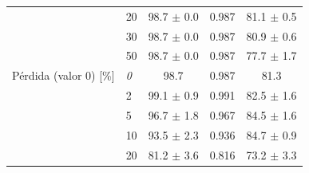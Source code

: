 \begin{table}[t]
\begin{tabular}{llccc}
 & 20 & 98.7 $\pm$ 0.0 & 0.987 & 81.1 $\pm$ 0.5 \\
 & 30 & 98.7 $\pm$ 0.0 & 0.987 & 80.9 $\pm$ 0.6 \\
 & 50 & 98.7 $\pm$ 0.0 & 0.987 & 77.7 $\pm$ 1.7 \\
\midrule
Pérdida (valor 0) [\%] & \textit{0} & 98.7 & 0.987 & 81.3 \\
 & 2 & 99.1 $\pm$ 0.9 & 0.991 & 82.5 $\pm$ 1.6 \\
 & 5 & 96.7 $\pm$ 1.8 & 0.967 & 84.5 $\pm$ 1.6 \\
 & 10 & 93.5 $\pm$ 2.3 & 0.936 & 84.7 $\pm$ 0.9 \\
 & 20 & 81.2 $\pm$ 3.6 & 0.816 & 73.2 $\pm$ 3.3 \\
\bottomrule
\end{tabular}
\end{table}

